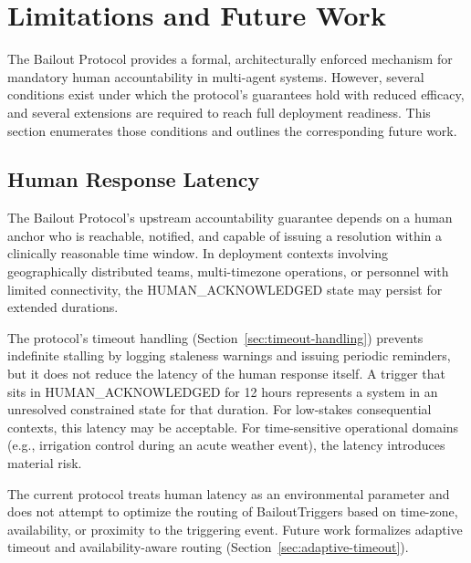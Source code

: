 \ifdefined\bxthree\else{}\fi
\ifdefined\purpose\else{}\fi
\ifdefined\bounds\else{}\fi
\ifdefined\fact\else{}\fi

\section{Limitations and Future Work}
\label{sec:limitations}

The Bailout Protocol provides a formal, architecturally enforced mechanism for mandatory human accountability in multi-agent systems. However, several conditions exist under which the protocol's guarantees hold with reduced efficacy, and several extensions are required to reach full deployment readiness. This section enumerates those conditions and outlines the corresponding future work.

\subsection{Human Response Latency}
\label{sec:human-latency}

The Bailout Protocol's upstream accountability guarantee depends on a human anchor who is reachable, notified, and capable of issuing a resolution within a clinically reasonable time window. In deployment contexts involving geographically distributed teams, multi-timezone operations, or personnel with limited connectivity, the HUMAN\_ACKNOWLEDGED state may persist for extended durations.

The protocol's timeout handling (Section~\ref{sec:timeout-handling}) prevents indefinite stalling by logging staleness warnings and issuing periodic reminders, but it does not reduce the latency of the human response itself. A trigger that sits in HUMAN\_ACKNOWLEDGED for 12 hours represents a system in an unresolved constrained state for that duration. For low-stakes consequential contexts, this latency may be acceptable. For time-sensitive operational domains (e.g., irrigation control during an acute weather event), the latency introduces material risk.

The current protocol treats human latency as an environmental parameter and does not attempt to optimize the routing of BailoutTriggers based on time-zone, availability, or proximity to the triggering event. Future work formalizes adaptive timeout and availability-aware routing (Section~\ref{sec:adaptive-timeout}).

